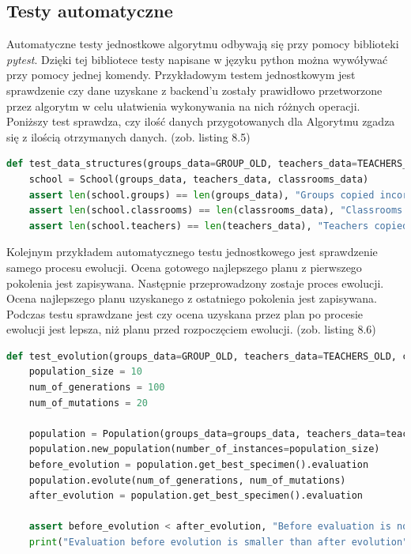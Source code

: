 	\subsection{Testy automatyczne}	
	Automatyczne testy jednostkowe algorytmu odbywają się przy pomocy biblioteki \textit{pytest}. Dzięki tej bibliotece testy napisane w języku python można wywóływać przy pomocy jednej komendy. Przykładowym testem jednostkowym jest sprawdzenie czy dane uzyskane z backend'u zostały prawidłowo przetworzone przez algorytm w celu ułatwienia wykonywania na nich różnych operacji. Poniższy test sprawdza, czy ilość danych przygotowanych dla Algorytmu zgadza się z ilością otrzymanych danych. (zob. listing 8.5)
	\newpage
	\begin{lstlisting}[language=Python, caption=Implementacja przykładowego testu jednostkowego sprawdzającego spójność danych, label={lst:TestJednostkowy}]
	def test_data_structures(groups_data=GROUP_OLD, teachers_data=TEACHERS_OLD, classrooms_data=CLASSES_OLD):
    school = School(groups_data, teachers_data, classrooms_data)
    assert len(school.groups) == len(groups_data), "Groups copied incorrectly to dict of class Group"
    assert len(school.classrooms) == len(classrooms_data), "Classrooms copied incorrectly to dict of class Classroom"
    assert len(school.teachers) == len(teachers_data), "Teachers copied incorrectly to dict of class Teacher"
\end{lstlisting}
	
	Kolejnym przykładem automatycznego testu jednostkowego jest sprawdzenie samego procesu ewolucji. Ocena gotowego najlepszego planu z pierwszego pokolenia jest zapisywana. Następnie przeprowadzony zostaje proces ewolucji. Ocena najlepszego planu uzyskanego z ostatniego pokolenia jest zapisywana. Podczas testu sprawdzane jest czy ocena uzyskana przez plan po procesie ewolucji jest lepsza, niż planu przed rozpoczęciem ewolucji. (zob. listing 8.6)
	
	\begin{lstlisting}[language=Python, caption=Implementacja przykładowego testu jednostkowego sprawdzającego proces ewolucji, label={lst:TestJednostkowy}]
	def test_evolution(groups_data=GROUP_OLD, teachers_data=TEACHERS_OLD, classrooms_data=CLASSES_OLD):
    population_size = 10
    num_of_generations = 100
    num_of_mutations = 20

    population = Population(groups_data=groups_data, teachers_data=teachers_data, classrooms_data=classrooms_data)
    population.new_population(number_of_instances=population_size)
    before_evolution = population.get_best_specimen().evaluation
    population.evolute(num_of_generations, num_of_mutations)
    after_evolution = population.get_best_specimen().evaluation

    assert before_evolution < after_evolution, "Before evaluation is not smaller than after evaluation"
    print("Evaluation before evolution is smaller than after evolution")
\end{lstlisting}
	
	 

